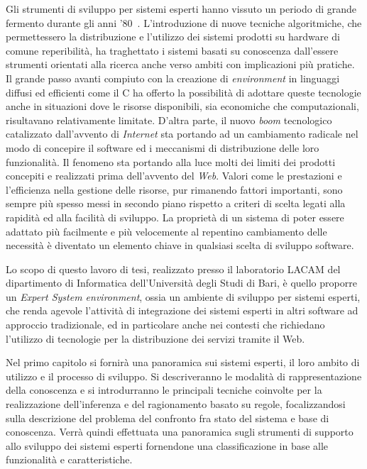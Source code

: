 Gli strumenti di sviluppo per sistemi esperti hanno vissuto un periodo di grande fermento durante gli anni '80~\cite{21aiproud}. L'introduzione di nuove tecniche algoritmiche, che permettessero la distribuzione e l'utilizzo dei sistemi prodotti su hardware di comune reperibilità, ha traghettato i sistemi basati su conoscenza dall'essere strumenti orientati alla ricerca anche verso ambiti con implicazioni più pratiche. Il grande passo avanti compiuto con la creazione di \emph{environment} in linguaggi diffusi ed efficienti come il C ha offerto la possibilità di adottare queste tecnologie anche in situazioni dove le risorse disponibili, sia economiche che computazionali, risultavano relativamente limitate.
D'altra parte, il nuovo \emph{boom} tecnologico catalizzato dall'avvento di \emph{Internet} sta portando ad un cambiamento radicale nel modo di concepire il software ed i meccanismi di distribuzione delle loro funzionalità. Il fenomeno sta portando alla luce molti dei limiti dei prodotti concepiti e realizzati prima dell'avvento del \emph{Web}. Valori come le prestazioni 
e l'efficienza nella gestione delle risorse, pur rimanendo fattori importanti, sono sempre più spesso messi in secondo piano rispetto a criteri di scelta legati alla rapidità ed alla facilità di sviluppo. La proprietà di un sistema di poter essere adattato più facilmente e più velocemente al repentino cambiamento delle necessità è diventato un elemento chiave in qualsiasi scelta di sviluppo software.

Lo scopo di questo lavoro di tesi, realizzato presso il laboratorio LACAM del dipartimento di Informatica dell'Università degli Studi di Bari, è quello proporre un \emph{Expert System environment}, ossia un ambiente di sviluppo per sistemi esperti, che renda agevole l'attività di integrazione dei sistemi esperti in altri software ad approccio tradizionale, ed in particolare anche nei contesti che richiedano l'utilizzo di tecnologie per la distribuzione dei servizi tramite il Web.

Nel primo capitolo si fornirà una panoramica sui sistemi esperti, il loro ambito di utilizzo e il processo di sviluppo. Si descriveranno le modalità di rappresentazione della conoscenza e si introdurranno le principali tecniche coinvolte per la realizzazione dell'inferenza e del ragionamento basato su regole, focalizzandosi sulla descrizione del problema del confronto fra stato del sistema e base di conoscenza. Verrà quindi effettuata una panoramica sugli strumenti di supporto allo sviluppo dei sistemi esperti fornendone una classificazione in base alle funzionalità e caratteristiche.

